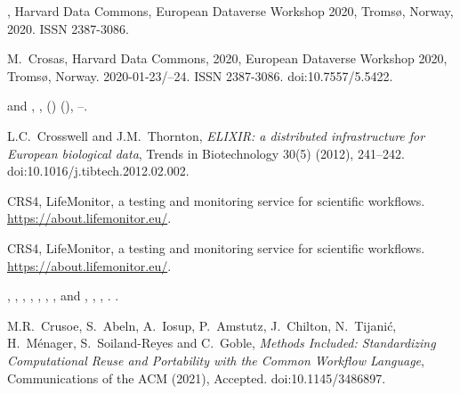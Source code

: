 \documentclass[ds,v1.1.2,openaccess]{iosart2x}%
\begin{document}
\begin{thebibliography}{}
%
\begin{botherref}
,
Harvard Data Commons,
European Dataverse Workshop 2020,
Troms{\o}, Norway,
2020. ISSN 2387-3086.
\end{botherref}
%
\OrigBibText
M.~Crosas,
Harvard Data Commons,
2020,
European Dataverse Workshop 2020, Troms{\o}, Norway. 2020-01-23/--24.
ISSN 2387-3086.
doi:10.7557/5.5422.
\endOrigBibText
{}
\endbibitem

%
\begin{barticle}
 and
,
,
()
(),
--.
\end{barticle}
%
\OrigBibText
L.C.~Crosswell and
J.M.~Thornton,
\textit{{ELIXIR}: a distributed infrastructure for European biological data},
Trends in Biotechnology
30(5)
(2012),
241--242.
doi:10.1016/j.tibtech.2012.02.002.
\endOrigBibText
{}
\endbibitem

%
\begin{botherref}
{CRS4},
{LifeMonitor}, a testing and monitoring service for scientific workflows.
\url{https://about.lifemonitor.eu/}.
\end{botherref}
%
\OrigBibText
CRS4,
{LifeMonitor}, a testing and monitoring service for scientific workflows.
\url{https://about.lifemonitor.eu/}.
\endOrigBibText
{}
\endbibitem

%
\begin{bbook}
,
,
,
,
,
,
,
 and
,
,
,
.
.
\end{bbook}
%
\OrigBibText
M.R.~Crusoe,
S.~Abeln,
A.~Iosup,
P.~Amstutz,
J.~Chilton,
N.~Tijani\'{c},
H.~M\'{e}nager,
S.~Soiland-Reyes and
C.~Goble,
\textit{Methods Included: Standardizing Computational Reuse and Portability
with the Common Workflow Language},
Communications of the ACM
(2021),
Accepted.
doi:10.1145/3486897.
\endOrigBibText
{}
\endbibitem


\end{thebibliography}
\end{document}

